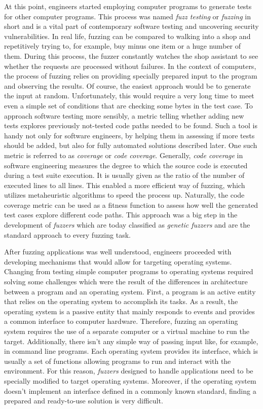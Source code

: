 At this point, engineers started employing computer programs to generate tests for other computer programs. This process was named \textit{fuzz testing} or \textit{fuzzing} in short and is a vital part of contemporary software testing and uncovering security vulnerabilities. In real life, fuzzing can be compared to walking into a shop and repetitively trying to, for example, buy minus one item or a huge number of them. During this process, the fuzzer constantly watches the shop assistant to see whether the requests are processed without failures. In the context of computers, the process of fuzzing relies on providing specially prepared input to the program and observing the results. Of course, the easiest approach would be to generate the input at random. Unfortunately, this would require a very long time to meet even a simple set of conditions that are checking some bytes in the test case. To approach software testing more sensibly, a metric telling whether adding new tests explores previously not-tested code paths needed to be found. Such a tool is handy not only for software engineers, by helping them in assessing if more tests should be added, but also for fully automated solutions described later. One such metric is referred to as \textit{coverage} or \textit{code coverage}. Generally, \textit{code coverage} in software engineering measures the degree to which the source code is executed during a test suite execution. It is usually given as the ratio of the number of executed lines to all lines. This enabled a more efficient way of fuzzing, which utilizes metaheuristic algorithms to speed the process up. Naturally, the code coverage metric can be used as a fitness function to assess how well the generated test cases explore different code paths. This approach was a big step in the development of \textit{fuzzers} which are today classified as \textit{genetic fuzzers} and are the standard approach to every fuzzing task. 

After fuzzing applications was well understood, engineers proceeded with developing mechanisms that would allow for targeting operating systems. Changing from testing simple computer programs to operating systems required solving some challenges which were the result of the differences in architecture between a program and an operating system. First, a program is an active entity that relies on the operating system to accomplish its tasks. As a result, the operating system is a passive entity that mainly responds to events and provides a common interface to computer hardware. Therefore, fuzzing an operating system requires the use of a separate computer or a virtual machine to run the target. Additionally, there isn't any simple way of passing input like, for example, in command line programs. Each operating system provides its interface, which is usually a set of functions allowing programs to run and interact with the environment. For this reason, \textit{fuzzers} designed to handle applications need to be specially modified to target operating systems. Moreover, if the operating system doesn't implement an interface defined in a commonly known standard, finding a prepared and ready-to-use solution is very difficult.

